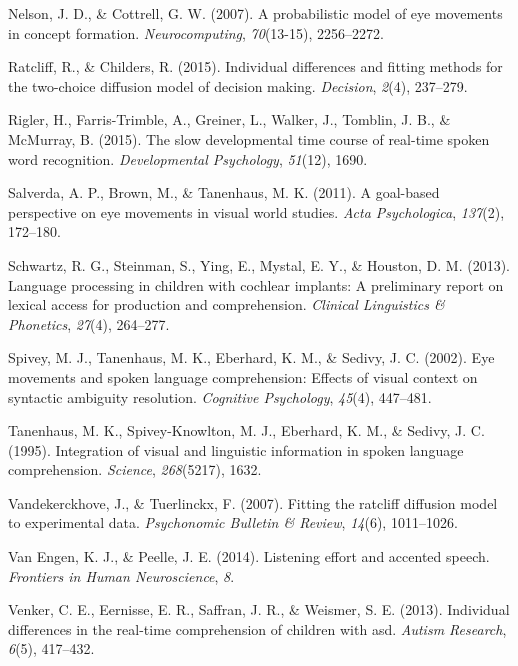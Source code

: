 \documentclass[english,floatsintext,man]{apa6}
\theoremstyle{definition}
\theoremstyle{definition}
\theoremstyle{definition}
\theoremstyle{remark}
\begin{document}
\leavevmode\hypertarget{ref-nelson2007probabilistic}{}%
Nelson, J. D., \& Cottrell, G. W. (2007). A probabilistic model of eye
movements in concept formation. \emph{Neurocomputing}, \emph{70}(13-15),
2256--2272.

\leavevmode\hypertarget{ref-ratcliff2015individual}{}%
Ratcliff, R., \& Childers, R. (2015). Individual differences and fitting
methods for the two-choice diffusion model of decision making.
\emph{Decision}, \emph{2}(4), 237--279.

\leavevmode\hypertarget{ref-rigler2015slow}{}%
Rigler, H., Farris-Trimble, A., Greiner, L., Walker, J., Tomblin, J. B.,
\& McMurray, B. (2015). The slow developmental time course of real-time
spoken word recognition. \emph{Developmental Psychology}, \emph{51}(12),
1690.

\leavevmode\hypertarget{ref-salverda2011goal}{}%
Salverda, A. P., Brown, M., \& Tanenhaus, M. K. (2011). A goal-based
perspective on eye movements in visual world studies. \emph{Acta
Psychologica}, \emph{137}(2), 172--180.

\leavevmode\hypertarget{ref-schwartz2013language}{}%
Schwartz, R. G., Steinman, S., Ying, E., Mystal, E. Y., \& Houston, D.
M. (2013). Language processing in children with cochlear implants: A
preliminary report on lexical access for production and comprehension.
\emph{Clinical Linguistics \& Phonetics}, \emph{27}(4), 264--277.

\leavevmode\hypertarget{ref-spivey2002eye}{}%
Spivey, M. J., Tanenhaus, M. K., Eberhard, K. M., \& Sedivy, J. C.
(2002). Eye movements and spoken language comprehension: Effects of
visual context on syntactic ambiguity resolution. \emph{Cognitive
Psychology}, \emph{45}(4), 447--481.

\leavevmode\hypertarget{ref-tanenhaus1995integration}{}%
Tanenhaus, M. K., Spivey-Knowlton, M. J., Eberhard, K. M., \& Sedivy, J.
C. (1995). Integration of visual and linguistic information in spoken
language comprehension. \emph{Science}, \emph{268}(5217), 1632.

\leavevmode\hypertarget{ref-vandekerckhove2007fitting}{}%
Vandekerckhove, J., \& Tuerlinckx, F. (2007). Fitting the ratcliff
diffusion model to experimental data. \emph{Psychonomic Bulletin \&
Review}, \emph{14}(6), 1011--1026.

\leavevmode\hypertarget{ref-van2014listening}{}%
Van Engen, K. J., \& Peelle, J. E. (2014). Listening effort and accented
speech. \emph{Frontiers in Human Neuroscience}, \emph{8}.

\leavevmode\hypertarget{ref-venker2013individual}{}%
Venker, C. E., Eernisse, E. R., Saffran, J. R., \& Weismer, S. E.
(2013). Individual differences in the real-time comprehension of
children with asd. \emph{Autism Research}, \emph{6}(5), 417--432.
\end{document}
